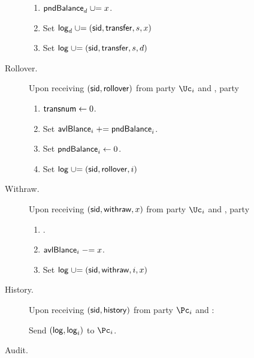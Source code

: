 \begin{functionality}
\begin{description}
\begin{enumerate}
			\item   $\mathsf{pndBalance}_d \mathrel{\cup}= x$.
			
			\item Set $\mathsf{log}_d \mathrel{\cup}= {(\mathsf{sid},\mathsf{transfer},s,x)}$
			
			\item Set $\mathsf{log} \mathrel{\cup}= {(\mathsf{sid},\mathsf{transfer},s,d)}$
			
		\end{enumerate}
		
		\item[Rollover.]     Upon receiving $(\mathsf{sid},\mathsf{rollover})$ from  party $\Uc_i$ and \Cc,  party \Cc
		
		\begin{enumerate}
			
			
			\item $\mathsf{transnum} \leftarrow 0$.
			
			
			\item Set $\mathsf{avlBlance}_i  \mathrel{+}= \mathsf{pndBalance}_i$.
			
			\item Set $\mathsf{pndBalance}_i  \leftarrow 0$.
			
			\item Set $\mathsf{log} \mathrel{\cup}= (\mathsf{sid},\mathsf{rollover},i)$
			
			
		\end{enumerate}

		
			\item[Withraw.]     Upon receiving $(\mathsf{sid},\mathsf{withraw},x)$ from  party $\Uc_i$ and \Cc,  party \Cc
		
		\begin{enumerate}
			
			
			 \item \Assert{$x\in \N$, $\balance_i  \ge x$ and $i \in [n]$}.
			
			\item $\mathsf{avlBlance}_i \mathrel{-}= x$.
			
			
			\item Set $\mathsf{log} \mathrel{\cup}= {(\mathsf{sid},\mathsf{withraw},i,x)}$
			
			
		\end{enumerate}
		
		
		\item[History.]     Upon receiving $(\mathsf{sid},\mathsf{history})$ from  party $\Pc_i$ and \Cc:  
		
		Send $(\mathsf{log},\mathsf{log}_i)$ to  $\Pc_i$.	 
		
		\item[Audit.]      
		
	\end{description}

\end{functionality}


